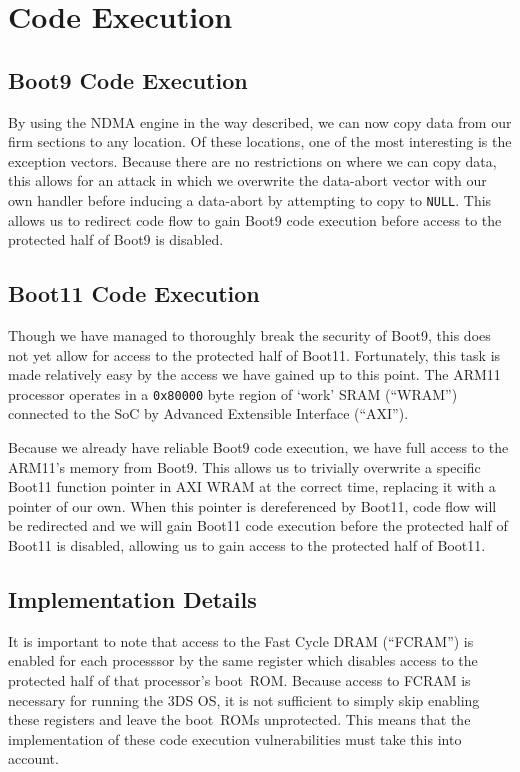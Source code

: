 \documentclass[journal]{IEEEtran}
\begin{document}
\section{Code Execution}

\subsection{Boot9 Code Execution}

By using the NDMA engine in the way described, we can now copy data from our
firm sections to any location. Of these locations, one of the most interesting
is the exception vectors. Because there are no restrictions on where we can copy
data, this allows for an attack in which we overwrite the data-abort vector with
our own handler before inducing a data-abort by attempting to copy to
\texttt{NULL}. This allows us to redirect code flow to gain Boot9 code execution
before access to the protected half of Boot9 is disabled.

\subsection{Boot11 Code Execution}

Though we have managed to thoroughly break the security of Boot9, this does not
yet allow for access to the protected half of Boot11. Fortunately, this task is
made relatively easy by the access we have gained up to this point. The ARM11
processor operates in a \texttt{0x80000} byte region of `work' SRAM (``WRAM'')
connected to the SoC by Advanced Extensible Interface (``AXI'').

Because we already have reliable Boot9 code execution, we have full access to
the ARM11's memory from Boot9. This allows us to trivially overwrite a specific
Boot11 function pointer in AXI WRAM at the correct time, replacing it with a
pointer of our own. When this pointer is dereferenced by Boot11, code flow will
be redirected and we will gain Boot11 code execution before the protected half
of Boot11 is disabled, allowing us to gain access to the protected half of
Boot11.

\subsection{Implementation Details}

It is important to note that access to the Fast Cycle DRAM (``FCRAM'') is
enabled for each processsor by the same register which disables access to the
protected half of that processor's boot~ROM. Because access to FCRAM is
necessary for running the 3DS OS, it is not sufficient to simply skip enabling
these registers and leave the boot~ROMs unprotected. This means that the
implementation of these code execution vulnerabilities must take this into
account.
\end{document}
